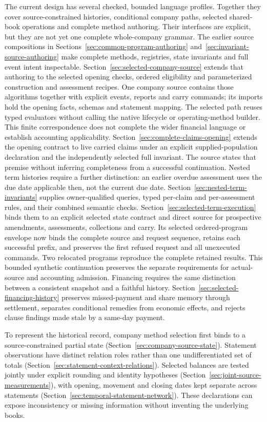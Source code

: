 The current design has several checked, bounded language profiles. Together
they cover source-constrained histories, conditional company paths, selected
shared-book operations and complete method authoring. Their interfaces are
explicit, but they are not yet one complete whole-company grammar.
The earlier source compositions in Sections~\ref{sec:common-program-authoring}
and~\ref{sec:invariant-source-authoring} make complete methods, registries,
state invariants and full event intent inspectable. Section~\ref{sec:selected-company-source}
extends that authoring to the selected opening checks, ordered eligibility
and parameterized construction and assessment recipes. One company source
contains those algorithms together with explicit events, reports and carry
commands; its imports hold the opening facts, schemas and statement mapping.
The selected path reuses typed evaluators without calling the native lifecycle
or operating-method builder. This finite correspondence does not complete
the wider financial language or establish accounting applicability.
Section~\ref{sec:complete-claims-opening} extends the opening contract
to live carried claims under an explicit supplied-population declaration
and the independently selected full invariant. The source states that
premise without inferring completeness from a successful continuation.
Nested term histories require a further distinction: an earlier overdue
assessment uses the due date applicable then, not the current due date.
Section~\ref{sec:nested-term-invariants} supplies owner-qualified queries,
typed per-claim and per-assessment rules, and their combined semantic checks.
Section~\ref{sec:selected-term-execution} binds them to an explicit selected
state contract and direct source for prospective amendments, assessments,
collections and carry. Its selected ordered-program envelope now binds the
complete source and request sequence, retains each successful prefix, and
preserves the first refused request and all unexecuted commands. Two relocated
programs reproduce the complete retained results. This bounded synthetic
continuation preserves the
separate requirements for actual-source and accounting admission.
Financing requires the same distinction between a consistent snapshot and a
faithful history. Section~\ref{sec:selected-financing-history} preserves
missed-payment and share memory through settlement, separates conditional
remedies from economic effects, and rejects clause findings made stale by a
same-day payment.

To represent the historical record, company method selection first binds to
a source-constrained partial state
(Section~\ref{sec:company-source-state}). Statement observations have
distinct relation roles rather than one undifferentiated set of totals
(Section~\ref{sec:statement-context-relations}). Selected balances are tested
jointly under explicit rounding and identity hypotheses
(Section~\ref{sec:joint-source-measurements}), with opening, movement and
closing dates kept separate across statements
(Section~\ref{sec:temporal-statement-network}). These declarations can expose
inconsistency or missing information without inventing the underlying books.

